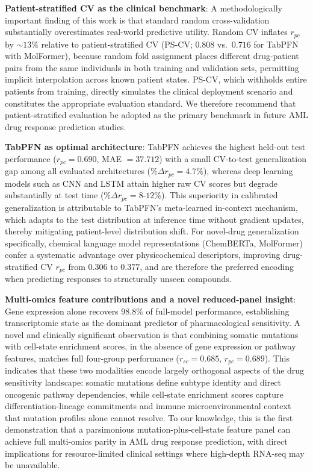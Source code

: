 \documentclass[pdflatex,sn-mathphys-num]{sn-jnl}
\theoremstyle{thmstyleone}
\theoremstyle{thmstyletwo}
\theoremstyle{thmstylethree}
\begin{document}
\textbf{Patient-stratified CV as the clinical benchmark}: A methodologically important finding of this work is that standard random cross-validation substantially overestimates real-world predictive utility. Random CV inflates $r_{pc}$ by $\sim\!13\%$ relative to patient-stratified CV (PS-CV; $0.808$ vs.\ $0.716$ for TabPFN with MolFormer), because random fold assignment places different drug-patient pairs from the same individuals in both training and validation sets, permitting implicit interpolation across known patient states. PS-CV, which withholds entire patients from training, directly simulates the clinical deployment scenario and constitutes the appropriate evaluation standard. We therefore recommend that patient-stratified evaluation be adopted as the primary benchmark in future AML drug response prediction studies.

\textbf{TabPFN as optimal architecture}: TabPFN \cite{hollmann2023tabpfn} achieves the highest held-out test performance ($r_{pc} = 0.690$, MAE $= 37.712$) with a small CV-to-test generalization gap among all evaluated architectures ($\%\Delta r_{pc} = 4.7\%$), whereas deep learning models such as CNN and LSTM attain higher raw CV scores but degrade substantially at test time ($\%\Delta r_{pc} = 8$-$12\%$). This superiority in calibrated generalization is attributable to TabPFN's meta-learned in-context mechanism, which adapts to the test distribution at inference time without gradient updates, thereby mitigating patient-level distribution shift. For novel-drug generalization specifically, chemical language model representations (ChemBERTa, MolFormer) confer a systematic advantage over physicochemical descriptors, improving drug-stratified CV $r_{pc}$ from $0.306$ to $0.377$, and are therefore the preferred encoding when predicting responses to structurally unseen compounds.

\textbf{Multi-omics feature contributions and a novel reduced-panel insight}: Gene expression alone recovers $98.8\%$ of full-model performance, establishing transcriptomic state as the dominant predictor of pharmacological sensitivity. A novel and clinically significant observation is that combining somatic mutations with cell-state enrichment scores, in the absence of gene expression or pathway features, matches full four-group performance ($r_{sc} = 0.685$, $r_{pc} = 0.689$). This indicates that these two modalities encode largely orthogonal aspects of the drug sensitivity landscape: somatic mutations define subtype identity and direct oncogenic pathway dependencies, while cell-state enrichment scores capture differentiation-lineage commitments and immune microenvironmental context that mutation profiles alone cannot resolve. To our knowledge, this is the first demonstration that a parsimonious mutation-plus-cell-state feature panel can achieve full multi-omics parity in AML drug response prediction, with direct implications for resource-limited clinical settings where high-depth RNA-seq may be unavailable.
\end{document}
